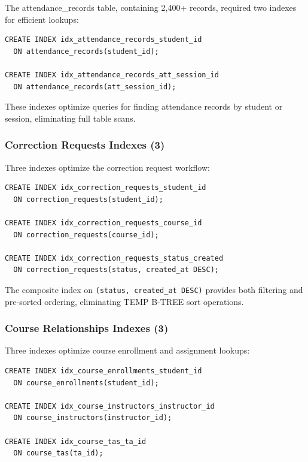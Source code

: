 \documentclass[conference]{IEEEtran}
\begin{document}
The attendance\_records table, containing 2,400+ records, required two indexes for efficient lookups:

\begin{lstlisting}[caption=Attendance Records Indexes]
CREATE INDEX idx_attendance_records_student_id
  ON attendance_records(student_id);

CREATE INDEX idx_attendance_records_att_session_id
  ON attendance_records(att_session_id);
\end{lstlisting}

These indexes optimize queries for finding attendance records by student or session, eliminating full table scans.

\subsubsection{Correction Requests Indexes (3)}

Three indexes optimize the correction request workflow:

\begin{lstlisting}[caption=Correction Requests Indexes]
CREATE INDEX idx_correction_requests_student_id
  ON correction_requests(student_id);

CREATE INDEX idx_correction_requests_course_id
  ON correction_requests(course_id);

CREATE INDEX idx_correction_requests_status_created
  ON correction_requests(status, created_at DESC);
\end{lstlisting}

The composite index on \texttt{(status, created\_at DESC)} provides both filtering and pre-sorted ordering, eliminating TEMP B-TREE sort operations.

\subsubsection{Course Relationships Indexes (3)}

Three indexes optimize course enrollment and assignment lookups:

\begin{lstlisting}[caption=Course Relationships Indexes]
CREATE INDEX idx_course_enrollments_student_id
  ON course_enrollments(student_id);

CREATE INDEX idx_course_instructors_instructor_id
  ON course_instructors(instructor_id);

CREATE INDEX idx_course_tas_ta_id
  ON course_tas(ta_id);
\end{lstlisting}
\end{document}
